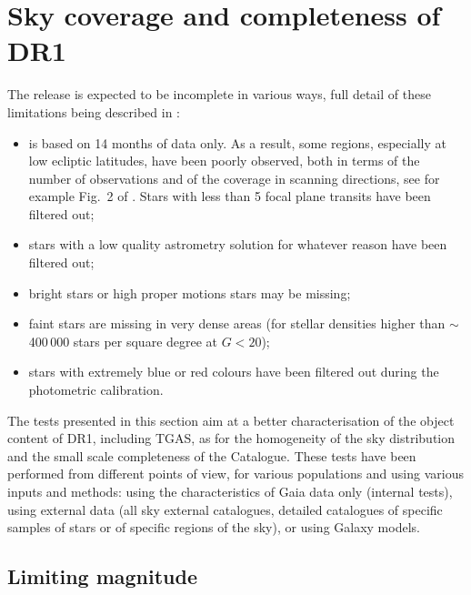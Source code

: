 \section{Sky coverage and completeness of DR1\label{sec:completeness}}

The {} release is expected to be incomplete in various ways, full detail of these limitations 
being described in \cite{DPACP-14,DPACP-8}: 
\begin{itemize}
\item {} is based on 14 months of data only. As a result, some regions, especially at low ecliptic latitudes, have been poorly observed, both in terms of the number of observations and of the coverage in scanning directions, see for example Fig.~2 of \cite{DPACP-8}. Stars with less than 5 focal plane transits have been filtered out; 
\item stars with a low quality astrometry solution for whatever reason have been filtered out; 
\item bright stars or high proper motions stars may be missing; 
\item faint stars are missing in very dense areas (for stellar densities higher than $\sim$ 400\,000 stars per square degree at $G<20$); 
\item stars with extremely blue or red colours have been filtered out during the photometric calibration. 
\end{itemize}

The tests presented in this section aim at a better characterisation of the object content of DR1, including TGAS,
as for the homogeneity of the sky distribution and the small scale completeness of the Catalogue.
These tests have been performed from different points of view, for various populations 
and using various inputs and methods: using the characteristics of Gaia data only (internal tests), using external data (all sky external catalogues, detailed catalogues of specific samples of stars or of specific regions of the sky), or using Galaxy models.


\subsection{Limiting magnitude\label{sec:faintlimit}}

